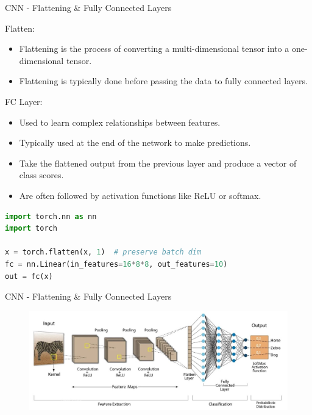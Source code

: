 \begin{frame}[fragile]{CNN - Flattening & Fully Connected Layers}
\begin{block}{Flatten:}
    \begin{itemize}
        \item Flattening is the process of converting a multi-dimensional tensor into a one-dimensional tensor.
        \item Flattening is typically done before passing the data to fully connected layers.
    \end{itemize}
\end{block}

\begin{block}{FC Layer:}
    \begin{itemize}
        \item Used to learn complex relationships between features.
        \item Typically used at the end of the network to make predictions.
        \item Take the flattened output from the previous layer and produce a vector of class scores.
        \item Are often followed by activation functions like ReLU or softmax.
    \end{itemize}
\end{block}

\begin{lstlisting}[language=Python, caption={Code snippet (PyTorch)}, basicstyle=\ttfamily\footnotesize]
import torch.nn as nn
import torch

x = torch.flatten(x, 1)  # preserve batch dim
fc = nn.Linear(in_features=16*8*8, out_features=10)
out = fc(x)
\end{lstlisting}
\end{frame}  

\begin{frame}{CNN - Flattening & Fully Connected Layers}
\begin{figure}
\centering
\includegraphics[width=1.0\textwidth,height=0.9\textheight,keepaspectratio]{images/cnn-fully-connected.jpeg}
\end{figure}
    
\end{frame}